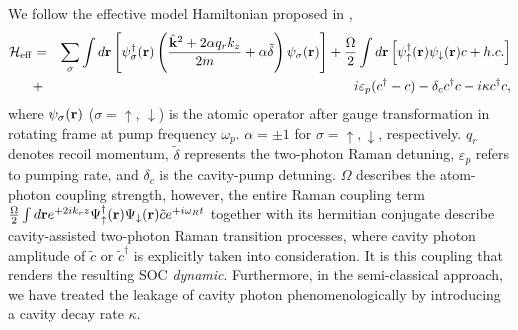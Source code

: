 \documentclass[journal,article,accept,moreauthors,pdftex,12pt,a4paper]{mdpi}
\def\ba{\begin{eqnarray}}
\def\ea{\end{eqnarray}}
\begin{document}
We follow the effective model Hamiltonian proposed in \cite{cavitySOC}, 
\ba
 \mathcal{H}_{\rm eff}& = & \sum_\sigma\int d{\bf r}\left[ \psi^\dagger_\sigma({\bf r})\left(\frac{ \hat{{\bf k}}^2+ 2\alpha q_r {k}_z}{2m}+\alpha\tilde{\delta}\right)\psi_\sigma({\bf r})\right]+  \frac{\Omega}{2}\int d{\bf r}\left[{\psi}_{\uparrow}^{\dagger}({\bf r}){\psi}_{\downarrow}({\bf r})c+ h.c. \right]\nonumber \\
 & + & i\varepsilon_{p}(c^{\dagger}-c)-\delta_c c^{\dagger}c-i\kappa c^{\dagger}c, \label{effH}
 \ea
where $\psi_\sigma({\bf r})$ ($\sigma = \uparrow$, $\downarrow$) is the atomic operator after gauge transformation in rotating frame at pump frequency $\omega_p$. $\alpha=\pm 1$ for $\sigma=\uparrow,\downarrow$, respectively. $q_r$ denotes recoil momentum, $\tilde{\delta}$ represents the two-photon Raman detuning, $\varepsilon_p$ refers to pumping rate, and $\delta_c$ is the cavity-pump detuning. $\Omega$ describes the atom-photon coupling strength, however, the entire Raman coupling term $ \frac{\Omega}{2}\int d{\bf r}e^{+2i k_{r}z}\Psi_{\uparrow}^{\dagger}({\bf r})\Psi_{\downarrow}({\bf r})\tilde{c}e^{+i\omega_{R}t}$ together with its hermitian conjugate describe cavity-assisted two-photon Raman transition processes, where cavity photon amplitude of $\tilde{c}$ or $\tilde{c}^\dag$ is explicitly taken into consideration. It is this coupling that renders the resulting SOC \emph{dynamic}. Furthermore, in the semi-classical approach, we have treated the leakage of cavity photon phenomenologically by introducing a cavity decay rate $\kappa$. 
\end{document}
